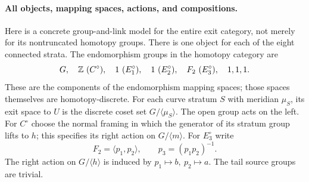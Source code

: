 \paragraph{All objects, mapping spaces, actions, and compositions.}
Here is a concrete group-and-link model for the entire exit category,
not merely for its nontruncated homotopy groups. There is one object
for each of the eight connected strata. The endomorphism groups
in the homotopy category are
\[
 G,\quad \Z\ (C^\circ),\quad 1\ (E_1^\circ),\quad
 1\ (E_2^\circ),\quad F_2\ (E_3^\circ),\quad 1,1,1.
\]
These are the components of the endomorphism mapping spaces; those
spaces themselves are homotopy-discrete. For each curve stratum
$S$ with meridian $\mu_S$, its exit space to $U$ is the discrete
coset set $G/\langle\mu_S\rangle$. The open group acts on the left.
For $C^\circ$ choose the normal framing in which the generator
of its stratum group lifts to $h$; this specifies its right action
on $G/\langle m\rangle$. For $E_3^\circ$ write
\[
 F_2=\langle p_1,p_2\rangle,\qquad p_3=(p_1p_2)^{-1}.
\]
The right action on $G/\langle h\rangle$ is induced by
$p_1\mapsto b,\ p_2\mapsto a$. The tail source groups are trivial.

